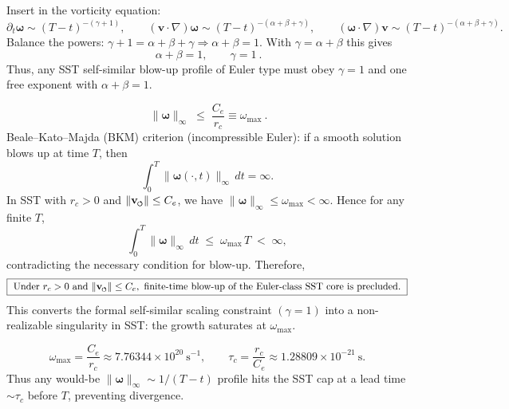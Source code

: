 Insert in the vorticity equation:
\[
    \partial_t \boldsymbol{\omega}\sim (T-t)^{-(\gamma+1)},\qquad
    (\mathbf{v}\!\cdot\!\nabla)\boldsymbol{\omega}\sim (T-t)^{-(\alpha+\beta+\gamma)},\qquad
    (\boldsymbol{\omega}\!\cdot\!\nabla)\mathbf{v}\sim (T-t)^{-(\alpha+\beta+\gamma)} .
\]
Balance the powers: \(\gamma+1=\alpha+\beta+\gamma \Rightarrow \alpha+\beta=1\).
With \(\gamma=\alpha+\beta\) this gives
\[
    \boxed{\ \alpha+\beta=1,\qquad \gamma=1\ } .
\]
Thus, any SST self-similar blow-up profile of Euler type must obey \(\gamma=1\) and one free exponent with \(\alpha+\beta=1\).

\[
    \boxed{\ \lVert \boldsymbol{\omega} \rVert_\infty \;\le\; \frac{C_e}{r_c} \equiv \omega_{\max}\ } .
\]
Beale–Kato–Majda (BKM) criterion (incompressible Euler): if a smooth solution blows up at time \(T\), then
\[
    \int_0^T \lVert \boldsymbol{\omega}(\cdot,t) \rVert_\infty \, dt = \infty .
\]
In SST with \(r_c>0\) and \(\lVert \mathbf{v}_{\mkern-2mu\scriptscriptstyle\boldsymbol{\circlearrowleft}} \rVert\le C_e\), we have \(\lVert \boldsymbol{\omega}\rVert_\infty\le \omega_{\max}<\infty\).
Hence for any finite \(T\),
\[
    \int_0^T \lVert \boldsymbol{\omega} \rVert_\infty \, dt \;\le\; \omega_{\max}\,T \;<\;\infty,
\]
contradicting the necessary condition for blow-up. Therefore,
\[
    \boxed{\ \text{Under } r_c>0 \text{ and } \lVert \mathbf{v}_{\mkern-2mu\scriptscriptstyle\boldsymbol{\circlearrowleft}} \rVert\le C_e,\ \text{finite-time blow-up of the Euler-class SST core is precluded.}\ }
\]
This converts the formal self-similar scaling constraint \((\gamma=1)\) into a non-realizable singularity in SST: the growth saturates at \(\omega_{\max}\).

\[
    \omega_{\max}=\frac{C_e}{r_c}\approx 7.76344\times 10^{20}\ \mathrm{s^{-1}},\qquad
    \tau_c=\frac{r_c}{C_e}\approx 1.28809\times 10^{-21}\ \mathrm{s}.
\]
Thus any would-be \( \lVert\boldsymbol{\omega}\rVert_\infty\sim 1/(T-t) \) profile hits the SST cap at a lead time \(\sim \tau_c\) before \(T\), preventing divergence.

